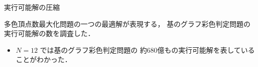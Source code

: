 \documentclass[dvipdfmx,11pt]{beamer}
\begin{document}
\begin{frame}{実行可能解の圧縮}
 \begin{block}{}
  多色頂点数最大化問題の一つの最適解が表現する，
  基のグラフ彩色判定問題の実行可能解の数を調査した．
 \end{block}
 
 \begin{center}
  
 \end{center}

 \begin{itemize}
  \item $N = 12$ では基のグラフ彩色判定問題の
	約680億もの実行可能解を表していることがわかった．
 \end{itemize}
\end{frame}
\end{document}
